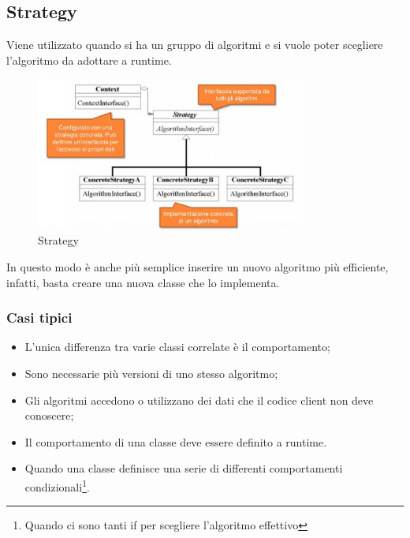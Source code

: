 \subsection{Strategy}
Viene utilizzato quando si ha un gruppo di algoritmi e si vuole poter scegliere l'algoritmo da adottare a runtime.
\begin{figure}[ht]
    \centering
    \includegraphics[width=0.8\textwidth]{immagini/strategy.png}
    \caption{Strategy}
\end{figure}
\FloatBarrier
In questo modo è anche più semplice inserire un nuovo algoritmo più efficiente, infatti, basta creare una nuova classe che lo implementa.

\subsubsection{Casi tipici}
\begin{itemize}
\item L'unica differenza tra varie classi correlate è il comportamento;
\item Sono necessarie più versioni di uno stesso algoritmo;
\item Gli algoritmi accedono o utilizzano dei dati che il codice client non deve conoscere;
\item Il comportamento di una classe deve essere definito a runtime.
\item Quando una classe definisce una serie di differenti comportamenti condizionali\footnote{Quando ci sono tanti if per scegliere l'algoritmo effettivo}.
\end{itemize}
